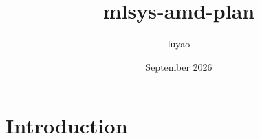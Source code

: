 \documentclass{article}
\title{mlsys-amd-plan}
\author{luyao }
\date{September 2026}
\begin{document}
\maketitle

\section{Introduction}
\end{document}
